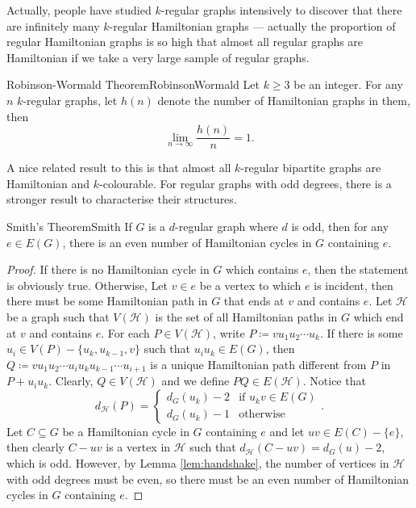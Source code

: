 \documentclass[math]{amznotes}
\theoremstyle{remark}
\newcommand{\0}{\mathbf{0}}
\newcommand{\1}{\mathbf{1}}
\begin{document}
Actually, people have studied $k$-regular graphs intensively to discover that there are infinitely many $k$-regular Hamiltonian graphs --- actually the proportion of regular Hamiltonian graphs is so high that almost all regular graphs are Hamiltonian if we take a very large sample of regular graphs.
\begin{thmbox}{Robinson-Wormald Theorem}{RobinsonWormald}
    Let $k \geq 3$ be an integer. For any $n$ $k$-regular graphs, let $h(n)$ denote the number of Hamiltonian graphs in them, then 
    \begin{equation*}
        \lim_{n \to \infty}\frac{h(n)}{n} = 1.
    \end{equation*}
\end{thmbox}
A nice related result to this is that almost all $k$-regular bipartite graphs are Hamiltonian and $k$-colourable. For regular graphs with odd degrees, there is a stronger result to characterise their structures.
\begin{thmbox}{Smith's Theorem}{Smith}
    If $G$ is a $d$-regular graph where $d$ is odd, then for any $e \in E(G)$, there is an even number of Hamiltonian cycles in $G$ containing $e$.
    \tcblower
    \begin{proof}
        If there is no Hamiltonian cycle in $G$ which contains $e$, then the statement is obviously true. Otherwise, Let $v \in e$ be a vertex to which $e$ is incident, then there must be some Hamiltonian path in $G$ that ends at $v$ and contains $e$. Let $\mathcal{H}$ be a graph such that $V(\mathcal{H})$ is the set of all Hamiltonian paths in $G$ which end at $v$ and contains $e$. For each $P \in V(\mathcal{H})$, write $P \coloneqq vu_1u_2\cdots u_k$. If there is some $u_i \in V(P) - \{u_k, u_{k - 1}, v\}$ such that $u_iu_k \in E(G)$, then $Q \coloneqq vu_1u_2\cdots u_iu_ku_{k - 1}\cdots u_{i + 1}$ is a unique Hamiltonian path different from $P$ in $P + u_iu_k$. Clearly, $Q \in V(\mathcal{H})$ and we define $PQ \in E(\mathcal{H})$. Notice that 
        \begin{equation*}
            d_{\mathcal{H}}(P) = \begin{cases}
                d_G(u_k) - 2 & \textrm{if } u_kv \in E(G) \\
                d_G(u_k) - 1 & \textrm{otherwise}
            \end{cases}.
        \end{equation*}
        Let $C \subseteq G$ be a Hamiltonian cycle in $G$ containing $e$ and let $uv \in E(C) - \{e\}$, then clearly $C - uv$ is a vertex in $\mathcal{H}$ such that $d_{\mathcal{H}}(C - uv) = d_G(u) - 2$, which is odd. However, by Lemma \ref{lem:handshake}, the number of vertices in $\mathcal{H}$ with odd degrees must be even, so there must be an even number of Hamiltonian cycles in $G$ containing $e$.
    \end{proof}
\end{thmbox}
\end{document}
